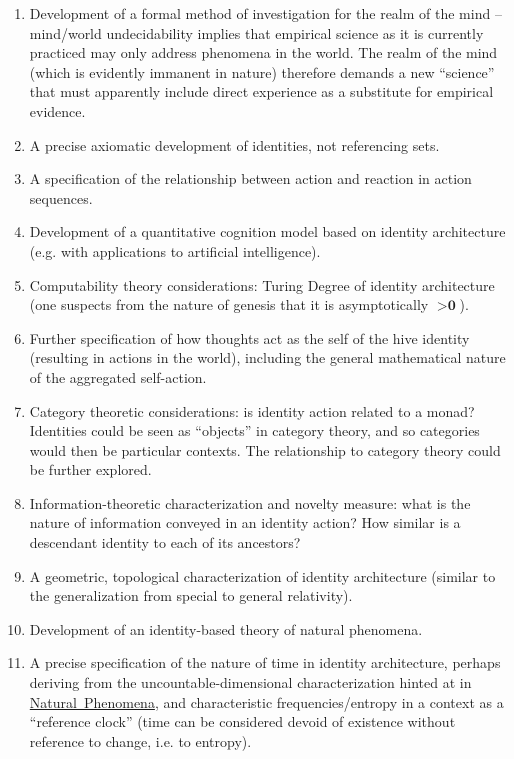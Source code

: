 \documentclass[pra,twocolumn,groupedaddress,10pt]{revtex4}
\theoremstyle{definition}
\begin{document}
\begin{enumerate}
	\item Development of a formal method of investigation for the realm of the mind -- mind/world undecidability implies that empirical science as it is currently practiced may only address phenomena in the world. The realm of the mind (which is evidently immanent in nature) therefore demands a new ``science'' that must apparently include direct experience as a substitute for empirical evidence.
	\item A precise axiomatic development of identities, not referencing sets.
	\item A specification of the relationship between action and reaction in action sequences.
	\item Development of a quantitative cognition model based on identity architecture (e.g. with applications to artificial intelligence).
	\item Computability theory considerations: Turing Degree of identity architecture (one suspects from the nature of genesis that it is asymptotically $> \textbf{0}$).
	\item Further specification of how thoughts act as the self of the hive identity (resulting in actions in the world), including the general mathematical nature of the aggregated self-action. %
	\item Category theoretic considerations: is identity action related to a monad? Identities could be seen as ``objects'' in category theory, and so categories would then be particular contexts. The relationship to category theory could be further explored.
	\item Information-theoretic characterization and novelty measure: what is the nature of information conveyed in an identity action? How similar is a descendant identity to each of its ancestors?
	\item A geometric, topological characterization of identity architecture (similar to the generalization from special to general relativity).
	\item Development of an identity-based theory of natural phenomena.
	\item A precise specification of the nature of time in identity architecture, perhaps deriving from the uncountable-dimensional characterization hinted at in \hyperref[sec:natphe]{Natural~Phenomena}, and characteristic frequencies/entropy in a context as a ``reference clock'' (time can be considered devoid of existence without reference to change, i.e. to entropy).

\end{enumerate}
\end{document}

